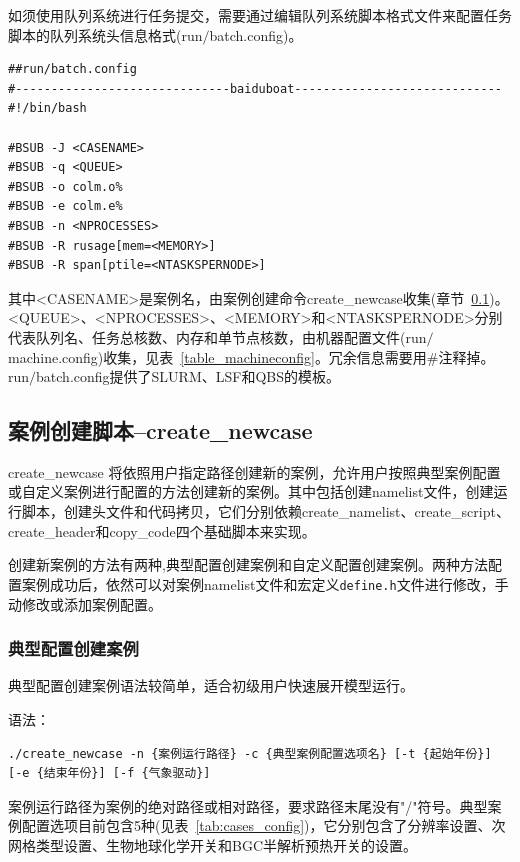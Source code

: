 如须使用队列系统进行任务提交，需要通过编辑队列系统脚本格式文件来配置任务脚本的队列系统头信息格式(run$\slash$batch.config)。

\begin{lstlisting}
##run/batch.config
#------------------------------baiduboat-----------------------------
#!/bin/bash

#BSUB -J <CASENAME>
#BSUB -q <QUEUE>
#BSUB -o colm.o%
#BSUB -e colm.e%
#BSUB -n <NPROCESSES>
#BSUB -R rusage[mem=<MEMORY>]
#BSUB -R span[ptile=<NTASKSPERNODE>]
\end{lstlisting}

其中<CASENAME>是案例名，由案例创建命令create\_newcase收集(章节~\ref{CreateNewcase})。<QUEUE>、<NPROCESSES>、<MEMORY>和<NTASKSPERNODE>分别代表队列名、任务总核数、内存和单节点核数，由机器配置文件(run$\slash$machine.config)收集，见表~\ref{table_machineconfig}。冗余信息需要用\#注释掉。run$\slash$batch.config提供了SLURM、LSF和QBS的模板。

\subsection{案例创建脚本--create\_newcase} \label{CreateNewcase}
create\_newcase 将依照用户指定路径创建新的案例，允许用户按照典型案例配置或自定义案例进行配置的方法创建新的案例。其中包括创建namelist文件，创建运行脚本，创建头文件和代码拷贝，它们分别依赖create\_namelist、create\_script、create\_header和copy\_code四个基础脚本来实现。

创建新案例的方法有两种,典型配置创建案例和自定义配置创建案例。两种方法配置案例成功后，依然可以对案例namelist文件和宏定义\texttt{define.h}文件进行修改，手动修改或添加案例配置。

\subsubsection{典型配置创建案例}

典型配置创建案例语法较简单，适合初级用户快速展开模型运行。

语法：

\begin{lstlisting}
./create_newcase -n {案例运行路径} -c {典型案例配置选项名} [-t {起始年份}] [-e {结束年份}] [-f {气象驱动}]
\end{lstlisting}

案例运行路径为案例的绝对路径或相对路径，要求路径末尾没有"/"符号。典型案例配置选项目前包含5种(见表~\ref{tab:cases_config})，它分别包含了分辨率设置、次网格类型设置、生物地球化学开关和BGC半解析预热开关的设置。


